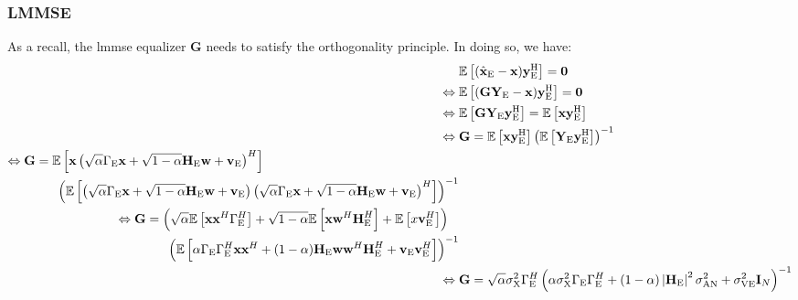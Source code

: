 \subsubsection{LMMSE}
As a recall, the \gls{lmmse} equalizer \textbf{G} needs to satisfy the orthogonality principle. In doing so, we have:
\begin{subequations}
    \begin{align}
         &\mathbb{E} \left[(\hat{\textbf{x}}_\text{E} - \textbf{x})\textbf{y}_\text{E}^\text{H}\right] = \textbf{0} \\
         \Leftrightarrow \; & \mathbb{E} \left[(\textbf{G} \textbf{Y}_\text{E}-\textbf{x}) \textbf{y}_\text{E}^\text{H}\right] = \textbf{0} \\
         \Leftrightarrow \; & \mathbb{E} \left[\textbf{G} \textbf{Y}_\text{E} \textbf{y}_\text{E}^\text{H} \right]  = \mathbb{E} \left[\textbf{x} \textbf{y}_\text{E}^\text{H}\right] \\
         \Leftrightarrow \; & \textbf{G}  = \mathbb{E} \left[\textbf{x} \textbf{y}_\text{E}^\text{H}\right] \left(\mathbb{E} \left[\textbf{Y}_\text{E} \textbf{y}_\text{E}^\text{H}\right]\right)^{-1} \\
         \begin{split}
             \Leftrightarrow \; & \textbf{G}  = \mathbb{E} \left[\textbf{x}  \left(   \sqrt{\alpha} \Gamma_{\text{E}} \textbf{x} + \sqrt{1-\alpha} \textbf{H}_{\text{E}} \textbf{w} + \textbf{v}_{\text{E}} \right)^H \right]  \\
             & \hspace{.35in} \left(\mathbb{E} \left[\left(   \sqrt{\alpha} \Gamma_{\text{E}} \textbf{x} + \sqrt{1-\alpha} \textbf{H}_{\text{E}} \textbf{w} + \textbf{v}_{\text{E}} \right)\left(   \sqrt{\alpha} \Gamma_{\text{E}} \textbf{x} + \sqrt{1-\alpha} \textbf{H}_{\text{E}} \textbf{w} + \textbf{v}_{\text{E}} \right)^H\right]\right)^{-1}
         \end{split}\\
         \begin{split}
            \Leftrightarrow \; & \textbf{G}  = \left(\sqrt{\alpha} \mathbb{E} \left[\textbf{xx}^H \Gamma_{\text{E}}^H\right] + \sqrt{1-\alpha}  \mathbb{E} \left[\textbf{x}\textbf{w}^H \textbf{H}_{\text{E}}^H\right]  + \mathbb{E} \left[x \textbf{v}_{\text{E}}^H\right]\right) \\
            &\hspace{.35in} \left( \mathbb{E} \left[\alpha \Gamma_\text{E} \Gamma_\text{E}^H \textbf{xx}^H + (1-\alpha) \textbf{H}_{\text{E}} \textbf{w}\textbf{w}^H\textbf{H}_{\text{E}}^H + \textbf{v}_{\text{E}}\textbf{v}_{\text{E}}^H\right]\right)^{-1}
         \end{split} \\
         \Leftrightarrow \; & \textbf{G}  = \sqrt{\alpha} \sigma^2_{\text{X}} \Gamma_{\text{E}}^H \left( \alpha \sigma^2_{\text{X}} \Gamma_{\text{E}}\Gamma_{\text{E}}^H  + (1-\alpha) \left|\textbf{H}_{\text{E}}\right|^2 \sigma^2_{\text{AN}} + \sigma^2_{\text{VE}} \textbf{I}_N\right)^{-1}
    \end{align}
    \label{eq:appA_lmmse}    
\end{subequations}
